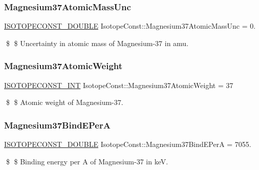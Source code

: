 \subsubsection{\texorpdfstring{Magnesium37\+Atomic\+Mass\+Unc}{Magnesium37AtomicMassUnc}}
{\footnotesize\ttfamily \mbox{\hyperlink{group___isotope_const-_macros_ga8f45a7272ce02c0b4c65c44636ed719a}{I\+S\+O\+T\+O\+P\+E\+C\+O\+N\+S\+T\+\_\+\+D\+O\+U\+B\+LE}} Isotope\+Const\+::\+Magnesium37\+Atomic\+Mass\+Unc = 0.}

\$ \$ Uncertainty in atomic mass of Magnesium-\/37 in amu. \mbox{\label{group___isotope_const-_magnesium-_mg37_ga0d1ef0fc761d3cfe9c284979159283d8}} 
\subsubsection{\texorpdfstring{Magnesium37\+Atomic\+Weight}{Magnesium37AtomicWeight}}
{\footnotesize\ttfamily \mbox{\hyperlink{group___isotope_const-_macros_ga5f18360b3e99483a35c32d789e62621c}{I\+S\+O\+T\+O\+P\+E\+C\+O\+N\+S\+T\+\_\+\+I\+NT}} Isotope\+Const\+::\+Magnesium37\+Atomic\+Weight = 37}

\$ \$ Atomic weight of Magnesium-\/37. \mbox{\label{group___isotope_const-_magnesium-_mg37_ga6fe2a27d31a3c2707195c3ad850c9064}} 
\subsubsection{\texorpdfstring{Magnesium37\+Bind\+E\+PerA}{Magnesium37BindEPerA}}
{\footnotesize\ttfamily \mbox{\hyperlink{group___isotope_const-_macros_ga8f45a7272ce02c0b4c65c44636ed719a}{I\+S\+O\+T\+O\+P\+E\+C\+O\+N\+S\+T\+\_\+\+D\+O\+U\+B\+LE}} Isotope\+Const\+::\+Magnesium37\+Bind\+E\+PerA = 7055.}

\$ \$ Binding energy per A of Magnesium-\/37 in keV. \mbox{\label{group___isotope_const-_magnesium-_mg37_ga202e991e72dcd6a15883159b666b39e9}} 
